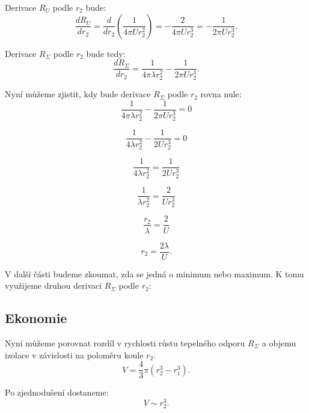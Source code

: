 \documentclass{article}
\begin{document}
Derivace $R_U$ podle $r_2$ bude:
$$
    \frac{dR_U}{dr_2} = \frac{d}{dr_2} \left( \frac{1}{4 \pi U r_2^2} \right) = -\frac{2}{4 \pi U r_2^3} = -\frac{1}{2 \pi U r_2^3}.
$$

Derivace $R_\Sigma$ podle $r_2$ bude tedy:
$$
    \frac{dR_\Sigma}{dr_2} = \frac{1}{4 \pi \lambda r_2^2} - \frac{1}{2 \pi U r_2^3}.
$$

Nyní můžeme zjistit, kdy bude derivace $R_\Sigma$ podle $r_2$ rovna nule:
$$
    \frac{1}{4 \pi \lambda r_2^2} - \frac{1}{2 \pi U r_2^3} = 0
$$

$$
    \frac{1}{4 \lambda r_2^2} - \frac{1}{2 U r_2^3} = 0
$$

$$
    \frac{1}{4 \lambda r_2^2} = \frac{1}{2 U r_2^3}
$$

$$
    \frac{1}{\lambda r_2^2} = \frac{2}{U r_2^3}
$$

$$
    \frac{r_2}{\lambda} = \frac{2}{U}
$$

$$
    r_2 = \frac{2 \lambda}{U}.
$$

V další části budeme zkoumat, zda se jedná o minimum nebo maximum. K tomu využijeme druhou derivaci $R_\Sigma$ podle $r_2$:

\begin{center}
\end{center}


\subsection{Ekonomie}

Nyní můžeme porovnat rozdíl v rychlosti růstu tepelného odporu $R_\Sigma$ a objemu izolace v závislosti na poloměru koule $r_2$.
$$
    V = \frac{4}{3} \pi (r_2^3 - r_1^3).
$$

Po zjednodušení dostaneme:
$$
    V \sim r_2^3.
$$
\end{document}
